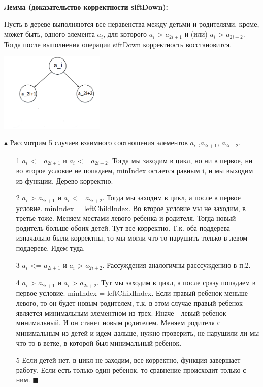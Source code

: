\textbf{
Лемма (доказательство корректности siftDown):}

Пусть в дереве выполняются все неравенства между детьми и родителями, кроме, может быть, одного элемента $a_{i}$, для которого $a_{i}$ > $a_{2i + 1}$ и (или) $a_{i}$ > $a_{2i+2}$. Тогда после выполнения операции siftDown корректность восстановится.

\includegraphics[width=5cm]{images/23_1}

$\blacktriangle $ Рассмотрим 5 случаев взаимного соотношения элементов $a_{i}$ ,$a_{2i+1}$, $a_{2i+2}$.
\begin{itemize}
    \item[1] $a_{i}$ <= $a_{2i + 1}$ и $a_{i}$ <= $a_{2i+2}$. Тогда мы заходим в цикл, но ни в первое, ни во второе условие не попадаем, minIndex остается равным i, и мы выходим из функции. Дерево корректно.
    
    \item[2] $a_{i}$ > $a_{2i + 1}$ и $a_{i}$ <= $a_{2i+2}$. Тогда мы заходим в цикл, а после в первое условие. minIndex = leftChildIndex. Во второе условие мы не заходим, в третье тоже. Меняем местами левого ребенка и родителя. Тогда новый родитель больше обоих детей. Тут все корректно. Т.к. оба поддерева изначально были корректны, то мы могли что-то нарушить только в левом поддереве. Идем туда.
     \item[3]$a_{i}$ <= $a_{2i + 1}$ и $a_{i}$ > $a_{2i+2}$. Рассуждения аналогичны расссуждению в п.2.
     \item[4] $a_{i}$ > $a_{2i + 1}$ и $a_{i}$ > $a_{2i+2}$. Тут мы заходим в цикл, а после сразу попадаем в первое условие. minIndex = leftChildIndex.
     Если правый ребенок меньше левого, то он будет новым родителем, т.к. в этом случае правый ребенок является минимальным элементном из трех. Иначе - левый ребенок минимальный. И он станет новым родителем. Меняем родителя с минимальным из детей и идем дальше, нужно проверить, не нарушили  ли мы что-то в ветке, в которой был минимальный ребенок.
     
    \item[5] Если детей нет, в цикл не заходим, все корректно, функция завершает работу. Если есть только один ребенок, то сравнение происходит только с ним. $\blacksquare$
     \end{itemize} 
     
